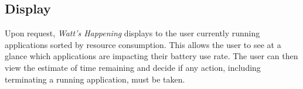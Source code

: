 \subsection*{Display} %
Upon request, \emph{Watt's Happening} displays to the user currently running applications sorted by resource consumption.
This allows the user to see at a glance which applications are impacting their battery use rate. %
The user can then view the estimate of time remaining and decide if any action, including terminating a running application, must be taken.
